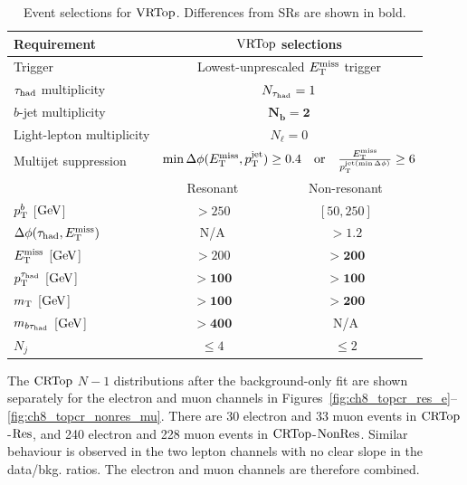 \begin{table}[htbp]
    \centering
    \small
    \caption[Event selections for $\VRTop$]{Event selections for $\VRTop$. Differences from SRs are shown in bold.}
    \label{tab:ch8_vrtop_regions}
    \begin{tabular}{lcc}
        \toprule
        Requirement & \multicolumn{2}{c}{\textbf{$\VRTop$ selections}} \\
        \midrule
        Trigger & \multicolumn{2}{c}{Lowest-unprescaled $E_{\mathrm{T}}^{\mathrm{miss}}$ trigger} \\
        $\tau_{\mathrm{had}}$ multiplicity & \multicolumn{2}{c}{$N_{\tau_{\mathrm{had}}}=1$} \\
        $b$-jet multiplicity & \multicolumn{2}{c}{$\bm{N_b=2}$} \\
        Light-lepton multiplicity & \multicolumn{2}{c}{$N_\ell=0$} \\
        Multijet suppression & \multicolumn{2}{c}{$\min\Delta\phi(E_{\mathrm{T}}^{\mathrm{miss}},p_{\mathrm{T}}^{\mathrm{jet}})\geq0.4\quad\text{or}\quad\frac{E_{\mathrm{T}}^{\mathrm{miss}}}{p_{\mathrm{T}}^{\mathrm{jet}(\min{\Delta\phi)}}}\geq6$} \\
        \midrule
         & Resonant & Non-resonant \\
        \midrule
        $p_{\mathrm{T}}^b$ [$\mathrm{GeV}$] & $>250$ & $[50, 250]$ \\
        $\Delta\phi(\tau_{\mathrm{had}}, E_{\mathrm{T}}^{\mathrm{miss}})$ & N/A & $>1.2$ \\
        $E_{\mathrm{T}}^{\mathrm{miss}}$ [$\mathrm{GeV}$] & $>200$ & $\bm{>200}$ \\
        $p_{\mathrm{T}}^{\tau_{\mathrm{had}}}$ [$\mathrm{GeV}$] & $\bm{>100}$ & $\bm{>100}$ \\
        $m_{\mathrm{T}}$ [$\mathrm{GeV}$] & $\bm{>100}$ & $\bm{>200}$ \\
        $m_{b\tau_{\mathrm{had}}}$ [$\mathrm{GeV}$] & $\bm{>400}$ & N/A \\
        $N_j$ & $\leq4$ & $\leq2$ \\
        \bottomrule
    \end{tabular}
\end{table}

The $\mathrm{CRTop}$ $N-1$ distributions after the background-only fit are shown separately for the electron and muon channels in Figures~\ref{fig:ch8_topcr_res_e}--\ref{fig:ch8_topcr_nonres_mu}.
There are 30 electron and 33 muon events in $\mathrm{CRTop}$-$\mathrm{Res}$, and 240 electron and 228 muon events in $\mathrm{CRTop}$-$\mathrm{NonRes}$.
Similar behaviour is observed in the two lepton channels with no clear slope in the data/bkg. ratios.
The electron and muon channels are therefore combined.



\clearpage

